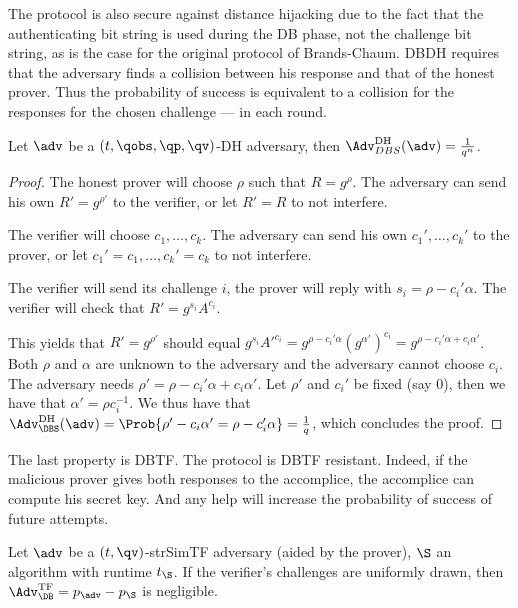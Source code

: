 The protocol is also secure against distance hijacking due to the fact that the 
authenticating bit string is used during the \ac{DB} phase, not the challenge 
bit string, as is the case for the original protocol of Brands-Chaum.
\Ac{DBDH} requires that the adversary finds a collision between his response 
and that of the honest prover.
Thus the probability of success is equivalent to a collision for the responses 
for the chosen challenge --- in each round.

\begin{theorem}
  Let \(\adv\) be a \((t, \qobs, \qp, \qv)\)-DH adversary, then 
  \(\Adv_{DBS}^{\text{DH}}(\adv) = \frac{1}{q^n}\).
\end{theorem}

\begin{proof}
  The honest prover will choose \(\rho\) such that \(R = g^\rho\).
  The adversary can send his own \(R' = g^{\rho'}\) to the verifier, or let 
  \(R' = R\) to not interfere.

  The verifier will choose \(c_1, \dotsc, c_k\).
  The adversary can send his own \(c_1', \dotsc, c_k'\) to the prover, or let 
  \(c_1' = c_1, \dotsc, c_k' = c_k\) to not interfere.

  The verifier will send its challenge \(i\), the prover will reply with \(s_i 
    = \rho - c_i' \alpha\).
  The verifier will check that \(R' = g^{s_i} A^{c_i}\).

  This yields that \(R' = g^{\rho'}\) should equal \(g^{s_i} A'^{c_i} = g^{\rho 
      - c_i' \alpha} (g^{\alpha'})^{c_i} = g^{\rho - c_i' \alpha + c_i 
      \alpha'}\).
  Both \(\rho\) and \(\alpha\) are unknown to the adversary and the adversary 
  cannot choose \(c_i\).
  The adversary needs \(\rho' = \rho - c_i' \alpha + c_i \alpha'\).
  Let \(\rho'\) and \(c_i'\) be fixed (say 0), then we have that \(\alpha' = 
    \rho c_i^{-1}\).
  We thus have that
  \(\Adv_{\DBS}^{\text{DH}}(\adv) = \Prob{\rho' - c_i \alpha' = \rho - c_i' 
      \alpha} = \frac{1}{q}\),
  which concludes the proof.
\end{proof}

The last property is \ac{DBTF}.
The protocol is \ac{DBTF} resistant.
Indeed, if the malicious prover gives both responses to the accomplice, the 
accomplice can compute his secret key.
And any help will increase the probability of success of future attempts.

\begin{theorem}
  Let \(\adv\) be a \((t, \qv)\)-strSimTF adversary (aided by the prover), 
  \(\S\) an algorithm with runtime \(t_{\S}\).
  If the verifier's challenges are uniformly drawn, then 
  \(\Adv_{\DB}^{\text{TF}} = p_{\adv} - p_{\S}\) is negligible.
\end{theorem}

